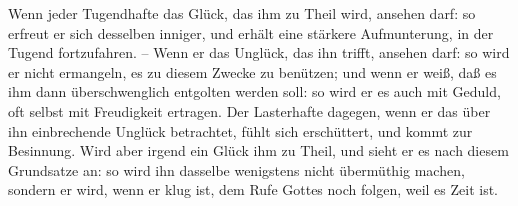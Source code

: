 \begin{aufza}
\item Wenn jeder Tugendhafte das Glück, das ihm zu Theil wird,  ansehen darf: so erfreut er sich desselben inniger, und erhält eine stärkere Aufmunterung, in der Tugend fortzufahren. -- Wenn er das Unglück, das ihn trifft,  ansehen darf: so wird er nicht ermangeln, es zu diesem Zwecke zu benützen; und wenn er weiß, daß es ihm dann überschwenglich entgolten werden soll: so wird er es auch mit Geduld, oft selbst mit Freudigkeit ertragen. Der Lasterhafte dagegen, wenn er das über ihn einbrechende Unglück  betrachtet, fühlt sich erschüttert, und kommt zur Besinnung. Wird aber irgend ein Glück ihm zu Theil, und sieht er es nach diesem Grundsatze an: so wird ihn dasselbe wenigstens nicht übermüthig machen, sondern er wird, wenn er klug ist, dem Rufe Gottes noch folgen, weil es Zeit ist.
\end{aufza}


